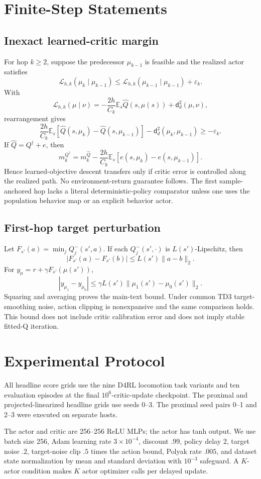 \documentclass[twoside]{article}
\newcommand{\E}{\mathbb E}
\begin{document}
\section{Finite-Step Statements}
\subsection{Inexact learned-critic margin}
For hop $k\ge2$, suppose the predecessor $\mu_{k-1}$ is feasible and the realized actor satisfies
\[
\mathcal L_{h,k}(\mu_k\mid\mu_{k-1})\le \mathcal L_{h,k}(\mu_{k-1}\mid\mu_{k-1})+\varepsilon_k.
\]
With
\[
\mathcal L_{h,k}(\mu\mid\nu)=-\frac{2h}{C_k}\E_s\widehat Q(s,\mu(s))+\mathsf d_d^2(\mu,\nu),
\]
rearrangement gives
\[
\frac{2h}{C_k}\E_s[\widehat Q(s,\mu_k)-\widehat Q(s,\mu_{k-1})]-\mathsf d_d^2(\mu_k,\mu_{k-1})\ge-\varepsilon_k.
\]
If $\widehat Q=Q^\dagger+e$, then
\[
m_k^{Q^\dagger}=m_k^{\widehat Q}-\frac{2h}{C_k}\E_s[e(s,\mu_k)-e(s,\mu_{k-1})].
\]
Hence learned-objective descent transfers only if critic error is controlled along the realized path. No environment-return guarantee follows. The first sample-anchored hop lacks a literal deterministic-policy comparator unless one uses the population behavior map or an explicit behavior actor.

\subsection{First-hop target perturbation}
Let $F_{s'}(a)=\min_jQ_j^-(s',a)$. If each $Q_j^-(s',\cdot)$ is $L(s')$-Lipschitz, then
\[
|F_{s'}(a)-F_{s'}(b)|\le L(s')\|a-b\|_2.
\]
For $y_{\mu}=r+\gamma F_{s'}(\mu(s'))$,
\[
|y_{\mu_1}-y_{\mu_0}|\le\gamma L(s')\|\mu_1(s')-\mu_0(s')\|_2.
\]
Squaring and averaging proves the main-text bound. Under common TD3 target-smoothing noise, action clipping is nonexpansive and the same comparison holds. This bound does not include critic calibration error and does not imply stable fitted-Q iteration.

\section{Experimental Protocol}
All headline score grids use the nine D4RL locomotion task variants and ten evaluation episodes at the final $10^6$-critic-update checkpoint. The proximal and projected-linearized headline grids use seeds 0--3. The proximal seed pairs 0--1 and 2--3 were executed on separate hosts.

The actor and critic are 256--256 ReLU MLPs; the actor has tanh output. We use batch size 256, Adam learning rate $3\times10^{-4}$, discount $.99$, policy delay 2, target noise $.2$, target-noise clip $.5$ times the action bound, Polyak rate $.005$, and dataset state normalization by mean and standard deviation with $10^{-3}$ safeguard. A $K$-actor condition makes $K$ actor optimizer calls per delayed update.
\end{document}
